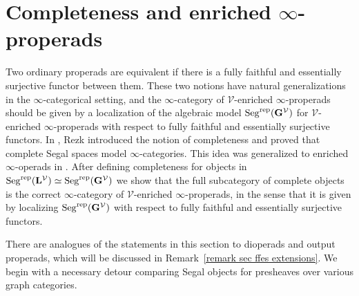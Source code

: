 \documentclass{amsart}
\numberwithin{theorem}{subsection}
\theoremstyle{definition}
\newcommand{\xV}{\mathcal{V}}
\newcommand{\name}[1]{\ensuremath{\text{\textup{#1}}}}
\newcommand{\levelg}{\mathbf{L}}
\newcommand{\levelV}{\levelg^\xV}
\newcommand{\bbY}{\mathbf{G}}
\newcommand{\bbYV}{\bbY^{\xV}}
\newcommand{\Seg}{\name{Seg}}
\newcommand{\Segrep}{\Seg^{\name{rep}}}
\begin{document}
\section{Completeness and enriched \texorpdfstring{$\infty$}{∞}-properads}\label{sec ffes}
Two ordinary properads are equivalent if there is a fully faithful and essentially surjective functor between them. 
These two notions have natural generalizations in the $\infty$-categorical setting, and the $\infty$-category of $\xV$-enriched $\infty$-properads should be given by a localization of the algebraic model $\Segrep(\bbYV)$ for $\xV$-enriched $\infty$-properads with respect to fully faithful and essentially surjective functors. 
In \cite{Rezk}, Rezk introduced the notion of completeness and proved that complete Segal spaces model $\infty$-categories. 
This idea was generalized to enriched $\infty$-operads in \cite{ChuHaugseng}.
After defining completeness for objects in $\Segrep(\levelV)\simeq\Segrep(\bbYV)$ we show that the full subcategory of complete objects is the correct $\infty$-category of $\xV$-enriched $\infty$-properads, in the sense that it is given by localizing $\Segrep(\bbYV)$ with respect to fully faithful and essentially surjective functors. 

There are analogues of the statements in this section to dioperads and output properads, which will be discussed in Remark~\ref{remark sec ffes extensions}.
We begin with a necessary detour comparing Segal objects for presheaves over various graph categories.
\end{document}

